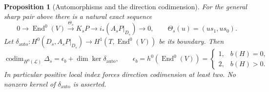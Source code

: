 \documentclass[11pt]{article}
\newtheorem{proposition}[theorem]{Proposition}
\theoremstyle{definition}\newtheorem{definition}[theorem]{Definition}
\theoremstyle{remark}\newtheorem{remark}[theorem]{Remark}
\newcommand{\End}{\operatorname{End}}
\begin{document}
\begin{proposition}[Automorphisms and the direction codimension]\label{prop:auto-directions}
For the general sharp pair above there is a natural exact sequence
\[
 0\longrightarrow\End^0(V)\xrightarrow{\Theta_s}K_sP
   \longrightarrow i_*(A_sP|_{D_s})\longrightarrow0,
 \qquad \Theta_s(u)=(us_1,us_0).                         \tag{P11}
\]
Let $\delta_{\mathrm{auto}}:H^0(D_s,A_sP|_{D_s})
\to H^1(T,\End^0(V))$ be its boundary. Then
\[
 \operatorname{codim}_{H^0(\mathcal L)}\Delta_s
 =\epsilon_b+\dim\ker\delta_{\mathrm{auto}},\qquad
 \epsilon_b=h^0(\End^0(V))=
 \begin{cases}1,&b(H)=0,\\2,&b(H)>0.\end{cases}            \tag{P12}
\]
In particular positive local index forces direction codimension at least two.
No nonzero kernel of $\delta_{\mathrm{auto}}$ is asserted.
\end{proposition}
\end{document}

